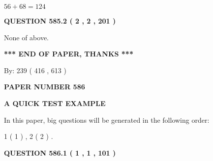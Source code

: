 \documentclass[12pt]{article}
\begin{document}
$ %
56 +  %
68=   %
124$
 
 
  
\vspace{0.2in}
  
{\textbf{\Large{QUESTION
585.2 
 ( 2 , 2 , 201 )
}}}
  
  
 
 
\noindent{}
 
 
 None of above.
 
 
 
 
   
   
 \vspace{0.2in}
 
   
   
   
   
\vspace{1.0in} 
{\textbf{\large{ *** END OF PAPER, THANKS *** }}} 
   
   
\hspace{1.0in} By: 
 239 ( 416 ,  613 )
   
   
   
   
\newpage 
\setcounter{page}{ 
   586001 } 
   
   
   
   
 {\textbf{ \Large{ PAPER NUMBER  586  }}}
   
   
\vspace{0.2in}
   
   
   
   
   
   
 \vspace{0.2in}
{\LARGE {\textbf{ A QUICK TEST EXAMPLE}}}
   
   
   
\vspace{0.2in}
   
In this paper, big questions will be generated in the following order: 
   
   
   1 ( 1 )
 ,
   2 ( 2 )
 .
  
\vspace{0.2in}
  
{\textbf{\Large{QUESTION
586.1 
 ( 1 , 1 , 101 )
}}}
  
  
 
 
\noindent{}
\end{document}
